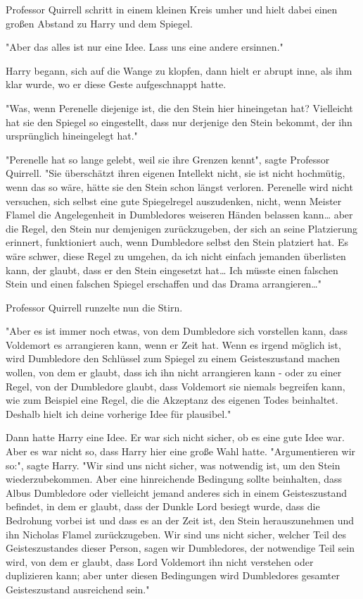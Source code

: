 {Professor Quirrell schritt in einem kleinen Kreis umher und hielt dabei einen großen Abstand zu Harry und dem Spiegel.

"Aber das alles ist nur eine Idee. Lass uns eine andere ersinnen."

Harry begann, sich auf die Wange zu klopfen, dann hielt er abrupt inne, als ihm klar wurde, wo er diese Geste aufgeschnappt hatte.

"Was, wenn Perenelle diejenige ist, die den Stein hier hineingetan hat? Vielleicht hat sie den Spiegel so eingestellt, dass nur derjenige den Stein bekommt, der ihn ursprünglich hineingelegt hat."

"Perenelle hat so lange gelebt, weil sie ihre Grenzen kennt", sagte Professor Quirrell. "Sie überschätzt ihren eigenen Intellekt nicht, sie ist nicht hochmütig, wenn das so wäre, hätte sie den Stein schon längst verloren. Perenelle wird nicht versuchen, sich selbst eine gute Spiegelregel auszudenken, nicht, wenn Meister Flamel die Angelegenheit in Dumbledores weiseren Händen belassen kann… aber die Regel, den Stein nur demjenigen zurückzugeben, der sich an seine Platzierung erinnert, funktioniert auch, wenn Dumbledore selbst den Stein platziert hat. Es wäre schwer, diese Regel zu umgehen, da ich nicht einfach jemanden überlisten kann, der glaubt, dass er den Stein eingesetzt hat… Ich müsste einen falschen Stein und einen falschen Spiegel erschaffen und das Drama arrangieren…"

Professor Quirrell runzelte nun die Stirn.

"Aber es ist immer noch etwas, von dem Dumbledore sich vorstellen kann, dass Voldemort es arrangieren kann, wenn er Zeit hat. Wenn es irgend möglich ist, wird Dumbledore den Schlüssel zum Spiegel zu einem Geisteszustand machen wollen, von dem er glaubt, dass ich ihn nicht arrangieren kann - oder zu einer Regel, von der Dumbledore glaubt, dass Voldemort sie niemals begreifen kann, wie zum Beispiel eine Regel, die die Akzeptanz des eigenen Todes beinhaltet. Deshalb hielt ich deine vorherige Idee für plausibel."

Dann hatte Harry eine Idee. Er war sich nicht sicher, ob es eine gute Idee war. Aber es war nicht so, dass Harry hier eine große Wahl hatte. "Argumentieren wir so:", sagte Harry. "Wir sind uns nicht sicher, was notwendig ist, um den Stein wiederzubekommen. Aber eine hinreichende Bedingung sollte beinhalten, dass Albus Dumbledore oder vielleicht jemand anderes sich in einem Geisteszustand befindet, in dem er glaubt, dass der Dunkle Lord besiegt wurde, dass die Bedrohung vorbei ist und dass es an der Zeit ist, den Stein herauszunehmen und ihn Nicholas Flamel zurückzugeben. Wir sind uns nicht sicher, welcher Teil des Geisteszustandes dieser Person, sagen wir Dumbledores, der notwendige Teil sein wird, von dem er glaubt, dass Lord Voldemort ihn nicht verstehen oder duplizieren kann; aber unter diesen Bedingungen wird Dumbledores gesamter Geisteszustand ausreichend sein."

}
